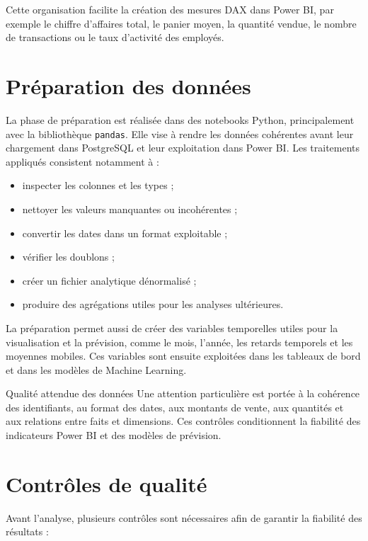\documentclass[12pt,a4paper,twoside]{report}
\begin{document}
Cette organisation facilite la création des mesures DAX dans Power BI, par exemple le chiffre d'affaires total, le panier moyen, la quantité vendue, le nombre de transactions ou le taux d'activité des employés.

\section{Préparation des données}

La phase de préparation est réalisée dans des notebooks Python, principalement avec la bibliothèque \texttt{pandas}. Elle vise à rendre les données cohérentes avant leur chargement dans PostgreSQL et leur exploitation dans Power BI. Les traitements appliqués consistent notamment à :

\begin{itemize}
  \item inspecter les colonnes et les types ;
  \item nettoyer les valeurs manquantes ou incohérentes ;
  \item convertir les dates dans un format exploitable ;
  \item vérifier les doublons ;
  \item créer un fichier analytique dénormalisé ;
  \item produire des agrégations utiles pour les analyses ultérieures.
\end{itemize}

La préparation permet aussi de créer des variables temporelles utiles pour la visualisation et la prévision, comme le mois, l'année, les retards temporels et les moyennes mobiles. Ces variables sont ensuite exploitées dans les tableaux de bord et dans les modèles de Machine Learning.

\begin{resultbox}{Qualité attendue des données}
Une attention particulière est portée à la cohérence des identifiants, au format des dates, aux montants de vente, aux quantités et aux relations entre faits et dimensions. Ces contrôles conditionnent la fiabilité des indicateurs Power BI et des modèles de prévision.
\end{resultbox}

\section{Contrôles de qualité}

Avant l'analyse, plusieurs contrôles sont nécessaires afin de garantir la fiabilité des résultats :
\end{document}
